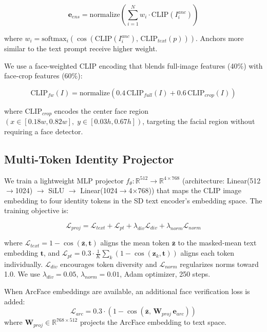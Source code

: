 \documentclass[10pt,twocolumn]{article}
\begin{document}
\begin{equation}
\mathbf{e}_{ens} = \text{normalize}\!\left(\sum_{i=1}^{N} w_i \cdot \text{CLIP}(I_i^{anc})\right)
\end{equation}

where $w_i = \text{softmax}_i\!\left(\cos\!\left(\text{CLIP}(I_i^{anc}),\, \text{CLIP}_{text}(p)\right)\right)$. Anchors more similar to the text prompt receive higher weight.

We use a face-weighted CLIP encoding that blends full-image features (40\%) with face-crop features (60\%):

\begin{equation}
\text{CLIP}_{fw}(I) = \text{normalize}\!\left(0.4\,\text{CLIP}_{full}(I) + 0.6\,\text{CLIP}_{crop}(I)\right)
\end{equation}

where $\text{CLIP}_{crop}$ encodes the center face region $(x \in [0.18w, 0.82w],\; y \in [0.03h, 0.67h])$, targeting the facial region without requiring a face detector.

\subsection{Multi-Token Identity Projector}

We train a lightweight MLP projector $f_\theta: \mathbb{R}^{512} \rightarrow \mathbb{R}^{4 \times 768}$ (architecture: Linear(512$\to$1024) $\to$ SiLU $\to$ Linear(1024$\to$4$\times$768)) that maps the CLIP image embedding to four identity tokens in the SD text encoder's embedding space. The training objective is:

\begin{equation}
\mathcal{L}_{proj} = \mathcal{L}_{text} + \mathcal{L}_{pt} + \lambda_{div}\mathcal{L}_{div} + \lambda_{norm}\mathcal{L}_{norm}
\end{equation}

where $\mathcal{L}_{text} = 1 - \cos(\bar{\mathbf{z}}, \mathbf{t})$ aligns the mean token $\bar{\mathbf{z}}$ to the masked-mean text embedding $\mathbf{t}$, and $\mathcal{L}_{pt} = 0.3 \cdot \frac{1}{K}\sum_k (1 - \cos(\mathbf{z}_k, \mathbf{t}))$ aligns each token individually. $\mathcal{L}_{div}$ encourages token diversity and $\mathcal{L}_{norm}$ regularizes norms toward 1.0. We use $\lambda_{div}=0.05$, $\lambda_{norm}=0.01$, Adam optimizer, 250 steps.

When ArcFace embeddings are available, an additional face verification loss is added:
\begin{equation}
\mathcal{L}_{arc} = 0.3 \cdot \left(1 - \cos\!\left(\bar{\mathbf{z}},\, \mathbf{W}_{proj}\,\mathbf{e}_{arc}\right)\right)
\end{equation}
where $\mathbf{W}_{proj} \in \mathbb{R}^{768 \times 512}$ projects the ArcFace embedding to text space.
\end{document}
